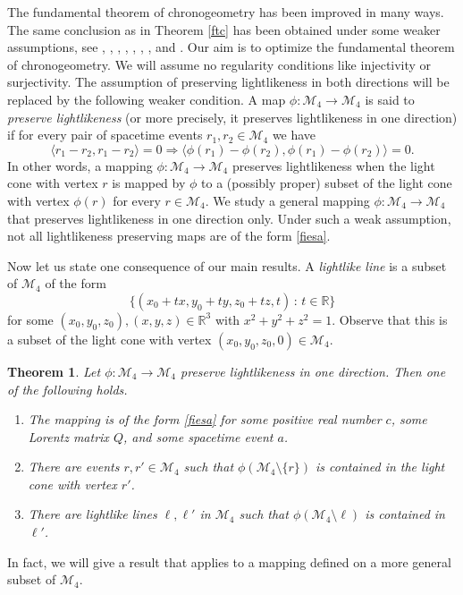 \documentclass[10pt,a4paper]{amsart}
\providecommand{\index}[1]{}
\newcommand\cM{{\mathcal{M}}}
\newtheorem{theorem}{Theorem}[section]
\theoremstyle{definition}
\theoremstyle{remark}
\numberwithin{subsection}{section}
\numberwithin{equation}{section}
\begin{document}
The fundamental theorem of chronogeometry has been improved in many ways. The same conclusion as in Theorem \ref{ftc} has been obtained under some weaker assumptions, see \cite{BoH}, \cite{ChP}, \cite{Les}, \cite{LeM}, \cite{Pfe}, \cite{PoR}, \cite{Sch}, and \cite{Zee}. Our aim is to optimize the fundamental theorem of chronogeometry.
We will assume no regularity conditions like injectivity or surjectivity. 
The assumption of preserving lightlikeness in both directions will be replaced by the following weaker condition.
A map $\phi \colon \mathcal{M}_4 \to \mathcal{M}_4$ is said to \emph{preserve lightlikeness} \index{preserve lightlikeness} (or more precisely, it preserves lightlikeness in one direction) if 
for every pair of spacetime events $r_1, r_2 \in \mathcal{M}_4$ we have
\[
\langle r_1 - r_2 , r_1 - r_2 \rangle = 0 \Rightarrow \langle \phi (r_1 ) - \phi ( r_2 ) , \phi ( r_1 ) - \phi ( r_2 ) \rangle = 0.
\]
In other words, a mapping $\phi \colon \mathcal{M}_4 \to \mathcal{M}_4$ preserves lightlikeness when the light cone with vertex $r$ is mapped by $\phi$ to a (possibly proper) subset of the light cone with vertex $\phi(r)$ for every $r\in \cM_4$.
We study a general mapping $\phi \colon \mathcal{M}_4 \to \mathcal{M}_4$ that preserves lightlikeness in one direction only.
Under such a weak assumption, not all lightlikeness preserving maps are of the form \eqref{fiesa}. 

Now let us state one consequence of our main results. 
A \emph{lightlike line} \index{lightlike line} is a subset of $\mathcal{M}_4$ of the form 
\[
\{(x_0+tx, y_0+ty, z_0+tz, t)\,:\, t\in \mathbb{R}\}
\]
for some $(x_0, y_0, z_0), (x,y,z) \in \mathbb{R}^3$ with $x^2+y^2+z^2=1$. 
Observe that this is a subset of the light cone with vertex $(x_0,y_0, z_0, 0)\in \cM_4$.
\begin{theorem}\label{MM}
Let $\phi\colon \mathcal{M}_4\to \mathcal{M}_4$ preserve lightlikeness in one direction. 
Then one of the following holds.
\begin{enumerate}
\item The mapping is of the form \eqref{fiesa} for some positive real number $c$, some Lorentz matrix $Q$, and some spacetime event $a$. 
\item There are events $r, r'\in \mathcal{M}_4$ such that $\phi(\mathcal{M}_4\setminus\{r\})$ is contained in the light cone with vertex $r'$. 
\item There are lightlike lines $\ell, \ell'$ in $\mathcal{M}_4$ such that $\phi(\mathcal{M}_4\setminus \ell)$ is contained in $\ell'$. 
\end{enumerate}
\end{theorem}
In fact, we will give a result that applies to a mapping defined on a more general subset of $\mathcal{M}_4$.
\end{document}
